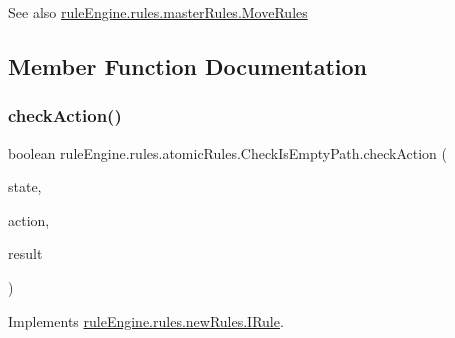 \begin{DoxySeeAlso}{See also}
\mbox{\hyperlink{classrule_engine_1_1rules_1_1master_rules_1_1_move_rules}{rule\+Engine.\+rules.\+master\+Rules.\+Move\+Rules}} 
\end{DoxySeeAlso}


\subsection{Member Function Documentation}
\mbox{\label{classrule_engine_1_1rules_1_1atomic_rules_1_1_check_is_empty_path_ad24f1d2f183a43c3a71d9716cf6d9413}} 
\subsubsection{\texorpdfstring{check\+Action()}{checkAction()}}
{\footnotesize\ttfamily boolean rule\+Engine.\+rules.\+atomic\+Rules.\+Check\+Is\+Empty\+Path.\+check\+Action (\begin{DoxyParamCaption}\item[{\mbox{\hyperlink{classgame_1_1game_state_1_1_game_state}{Game\+State}}}]{state,  }\item[{\mbox{\hyperlink{classrule_engine_1_1_game_action}{Game\+Action}}}]{action,  }\item[{\mbox{\hyperlink{classrule_engine_1_1_rule_result}{Rule\+Result}}}]{result }\end{DoxyParamCaption})\hspace{0.3cm}{\ttfamily [inline]}}



Implements \mbox{\hyperlink{interfacerule_engine_1_1rules_1_1new_rules_1_1_i_rule_a72ce29a47d7a5fba75a09444a50a481e}{rule\+Engine.\+rules.\+new\+Rules.\+I\+Rule}}.


